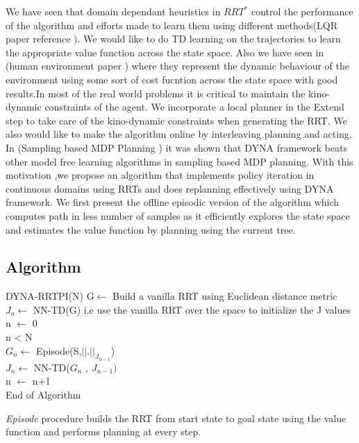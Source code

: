 \documentclass[MTech]{iitmdiss}
\begin{document}
We have seen that domain dependant heuristics in $RRT^*$ control the performance of the algorithm and efforts made to learn them using different methods(LQR paper reference ). We would like to do TD learning on the trajectories to learn the appropriate value function across the state space. Also we have seen in (human environment paper ) where they represent the dynamic behaviour of the environment using some sort of cost fucntion across the state space with good results.In most of the real world problems it is critical to maintain the kino-dynamic constraints of the agent. We incorporate a local planner in the Extend step to take care of the kino-dynamic constraints when generating the RRT. We also would like to make the algorithm online by interleaving planning and acting. In (Sampling based MDP Planning ) it was shown that DYNA framework beats other model free learning algorithms in sampling based MDP planning. With this motivation ,we propose an algorithm that implements policy iteration in continuous domains using RRTs and does replanning effectively using DYNA framework.  We first present the offline episodic version of the algorithm which computes path in less number of samples as it efficiently explores the state space and estimates the value function by planning using the current tree. 

\subsection{Algorithm}

\begin{algorithm}{DYNA-RRTPI(N)}{
\label{algo:DYNA-RRTPI}
}
G$\leftarrow$ Build a vanilla RRT using Euclidean distance metric\\
$J_o \leftarrow$ NN-TD(G) i.e use the vanilla RRT over the space to initialize the J values\\ 
n $\leftarrow$ 0\\
\qwhile n < N \\
$G_n \leftarrow$ Episode(S,$ || . ||_{J_{n-1}} $)\\
$J_n \leftarrow$ NN-TD($G_n$ , $J_{n-1})$ \\
n $\leftarrow$ n+1\\
End of Algorithm
\end{algorithm}

\emph{Episode} procedure builds the RRT from start state to goal state using the value function and performs planning at every step.
\end{document}

